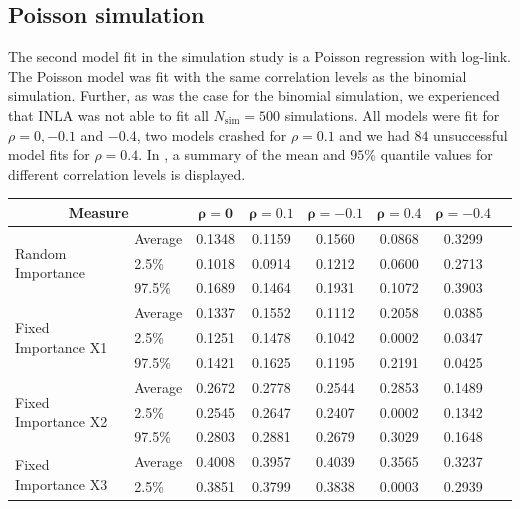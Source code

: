 \subsection{Poisson simulation}
The second model fit in the simulation study is a Poisson regression with log-link. The Poisson model was fit with the same correlation levels as the binomial simulation. Further, as was the case for the binomial simulation, we experienced that INLA was not able to fit all $N_{\text{sim}}=500$ simulations. All models were fit for $\rho=0, -0.1$ and $-0.4$, two models crashed for $\rho=0.1$ and we had $84$ unsuccessful model fits for $\rho=0.4$. In , a summary of the mean and $95\%$ quantile values for different correlation levels is displayed.
\begin{table}[H]
  \centering
  \begin{tabular}{@{}llcccccc@{}}
    \toprule
    \multicolumn{2}{c}{\textbf{Measure}} & $\mathbf{\rho=0}$ & $\mathbf{\rho=0.1}$ & $\mathbf{\rho=-0.1}$ & $\mathbf{\rho=0.4}$ & $\mathbf{\rho=-0.4}$ \\ \midrule
    \multirow{3}{*}{Random Importance} & Average & 0.1348 & 0.1159 & 0.1560 & 0.0868 & 0.3299 \\
                                       & 2.5\%   & 0.1018 & 0.0914 & 0.1212 & 0.0600 & 0.2713 \\
                                       & 97.5\%  & 0.1689 & 0.1464 & 0.1931 & 0.1072 & 0.3903 \\ \midrule
    \multirow{3}{*}{Fixed Importance X1} & Average & 0.1337 & 0.1552 & 0.1112 & 0.2058 & 0.0385 \\
                                         & 2.5\%   & 0.1251 & 0.1478 & 0.1042 & 0.0002 & 0.0347 \\
                                         & 97.5\%  & 0.1421 & 0.1625 & 0.1195 & 0.2191 & 0.0425 \\ \midrule
    \multirow{3}{*}{Fixed Importance X2} & Average & 0.2672 & 0.2778 & 0.2544 & 0.2853 & 0.1489 \\
                                         & 2.5\%   & 0.2545 & 0.2647 & 0.2407 & 0.0002 & 0.1342 \\
                                         & 97.5\%  & 0.2803 & 0.2881 & 0.2679 & 0.3029 & 0.1648 \\ \midrule
    \multirow{3}{*}{Fixed Importance X3} & Average & 0.4008 & 0.3957 & 0.4039 & 0.3565 & 0.3237 \\
                                         & 2.5\%   & 0.3851 & 0.3799 & 0.3838 & 0.0003 & 0.2939 \\

\end{tabular}
\end{table}

